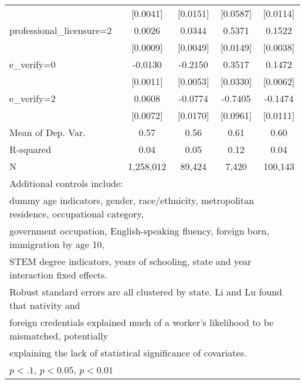 \begin{table}[htbp]
\begin{tabular}{l*{4}{c}}
                    &    [0.0041]         &    [0.0151]         &    [0.0587]         &    [0.0114]         \\
\addlinespace
professional\_licensure=2&      0.0026\sym{***}&      0.0344\sym{***}&      0.5371\sym{***}&      0.1522\sym{***}\\
                    &    [0.0009]         &    [0.0049]         &    [0.0149]         &    [0.0038]         \\
\addlinespace
e\_verify=0          &     -0.0130\sym{***}&     -0.2150\sym{***}&      0.3517\sym{***}&      0.1472\sym{***}\\
                    &    [0.0011]         &    [0.0053]         &    [0.0330]         &    [0.0062]         \\
\addlinespace
e\_verify=2          &      0.0608\sym{***}&     -0.0774\sym{***}&     -0.7405\sym{***}&     -0.1474\sym{***}\\
                    &    [0.0072]         &    [0.0170]         &    [0.0961]         &    [0.0111]         \\
\midrule
Mean of Dep. Var.   &        0.57         &        0.56         &        0.61         &        0.60         \\
R-squared           &        0.04         &        0.05         &        0.12         &        0.04         \\
N                   &   1,258,012         &      89,424         &       7,420         &     100,143         \\
\bottomrule
\multicolumn{5}{l}{\footnotesize Additional controls include:}\\
\multicolumn{5}{l}{\footnotesize dummy age indicators, gender, race/ethnicity, metropolitan residence, occupational category,}\\
\multicolumn{5}{l}{\footnotesize government occupation, English-speaking fluency, foreign born, immigration by age 10,}\\
\multicolumn{5}{l}{\footnotesize STEM degree indicators, years of schooling, state and year interaction fixed effects.}\\
\multicolumn{5}{l}{\footnotesize Robust standard errors are all clustered by state. Li and Lu found that nativity and}\\
\multicolumn{5}{l}{\footnotesize foreign credentials explained much of a worker's likelihood to be mismatched, potentially}\\
\multicolumn{5}{l}{\footnotesize explaining the lack of statistical significance of covariates.}\\
\multicolumn{5}{l}{\footnotesize \sym{*} \(p<.1\), \sym{**} \(p<0.05\), \sym{***} \(p<0.01\)}\\
\end{tabular}
\end{table}
